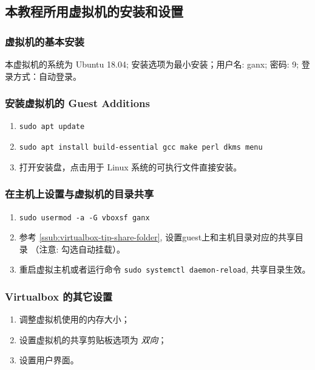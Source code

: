 \documentclass[cn,11pt, simple]{elegantbook}
\begin{document}
\subsection{本教程所用虚拟机的安装和设置}%
\label{sub:virtualbox-guest-settings}

\subsubsection{虚拟机的基本安装}%
\label{ssub:linux-ubuntu}

本虚拟机的系统为 Ubuntu 18.04; 安装选项为最小安装；用户名: ganx; 密码: 9;
登录方式：自动登录。

\subsubsection{安装虚拟机的 Guest Additions}%
\label{ssub:virtualbox-guest-additions}
\begin{enumerate}
    \item \lstinline{sudo apt update} 
    \item \lstinline{sudo apt install build-essential gcc make perl dkms menu } 
    \item 打开安装盘，点击用于 Linux 系统的可执行文件直接安装。
\end{enumerate}

\subsubsection{在主机上设置与虚拟机的目录共享}%
\label{ssub:vitualbox-shared-folder}
\begin{enumerate}
    \item \lstinline{sudo usermod -a -G vboxsf ganx} 
    \item 参考 \ref{ssub:virtualbox-tip-share-folder},
        设置guest上和主机目录对应的共享目录 （注意: 勾选自动挂载）。
    \item 重启虚拟主机或者运行命令 \lstinline{sudo systemctl daemon-reload},
        共享目录生效。
\end{enumerate}

\subsubsection{Virtualbox 的其它设置}%
\label{ssub:virtualbox-others}
\begin{enumerate}
    \item 调整虚拟机使用的内存大小；
    \item 设置虚拟机的共享剪贴板选项为 \emph{双向}；
    \item 设置用户界面。
\end{enumerate}
\end{document}
